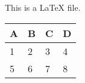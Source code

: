 \documentclass[12pt]{article}
\begin{document}
  This is a LaTeX file.
  \begin{table}[]\begin{tabular}{|l|l|l|l|} \hline A&B&C&D \\\hline 1&2&3&4 \\\hline 5&6&7&8\\\hline \end{tabular}\end{table}%
\end{document}

